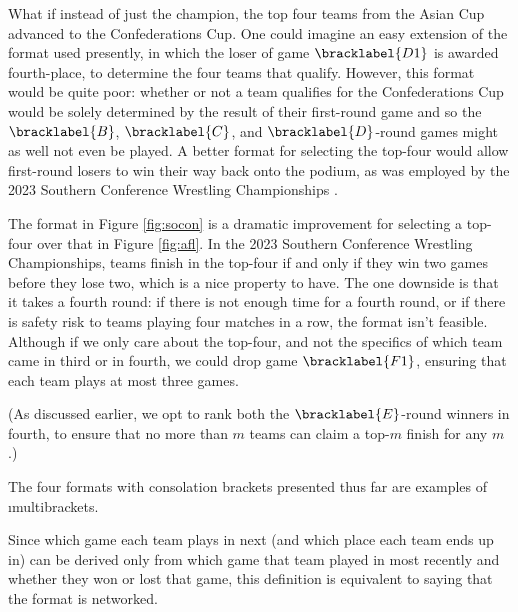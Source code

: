{    What if instead of just the champion, the top four teams from the Asian Cup advanced to the Confederations Cup. One could imagine an easy extension of the format used presently, in which the loser of game $\bracklabel{D1}$ is awarded fourth-place, to determine the four teams that qualify. However, this format would be quite poor: whether or not a team qualifies for the Confederations Cup would be solely determined by the result of their first-round game and so the $\bracklabel{B}$, $\bracklabel{C}$, and $\bracklabel{D}$-round games might as well not even be played. A better format for selecting the top-four would allow first-round losers to win their way back onto the podium, as was employed by the 2023 Southern Conference Wrestling Championships \cite{wiki_socon}.


    The format in Figure \ref{fig:socon} is a dramatic improvement for selecting a top-four over that in Figure \ref{fig:afl}. In the 2023 Southern Conference Wrestling Championships, teams finish in the top-four if and only if they win two games before they lose two, which is a nice property to have. The one downside is that it takes a fourth round: if there is not enough time for a fourth round, or if there is safety risk to teams playing four matches in a row, the format isn't feasible. Although if we only care about the top-four, and not the specifics of which team came in third or in fourth, we could drop game $\bracklabel{F1}$, ensuring that each team plays at most three games.


    (As discussed earlier, we opt to rank both the $\bracklabel{E}$-round winners in fourth, to ensure that no more than $m$ teams can claim a top-$m$ finish for any $m$.)

    The four formats with consolation brackets presented thus far are examples of \i{multibrackets}.


    Since which game each team plays in next (and which place each team ends up in) can be derived only from which game that team played in most recently and whether they won or lost that game, this definition is equivalent to saying that the format is networked.
    
}
